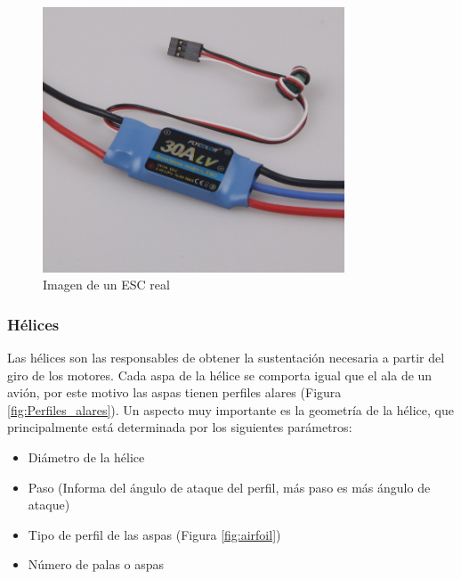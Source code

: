 \documentclass[12pt,twoside]{article}
\begin{document}
			\begin{figure}
			\centering
			\includegraphics[width=0.8\textwidth]{Imatges/Funcionament/ESC.png}
			\caption{Imagen de un ESC real}
			\label{fig:ESC}
		\end{figure}

			
			\subsubsection{Hélices}\label{subsubsec:propellers}
			
			Las hélices son las responsables de obtener la sustentación necesaria a partir del giro de los motores. Cada aspa de la hélice se comporta igual que el ala de un avión, por este motivo las aspas tienen perfiles alares (Figura \ref{fig:Perfiles_alares}).
Un aspecto muy importante es la geometría de la hélice, que principalmente está determinada por los siguientes parámetros:
		\begin{itemize}
			\item Diámetro de la hélice
			\item Paso (Informa del ángulo de ataque del perfil, más paso es más ángulo de ataque)
			\item Tipo de perfil de las aspas (Figura \ref{fig:airfoil})
			\item Número de palas o aspas
		\end{itemize}
		
\end{document}
